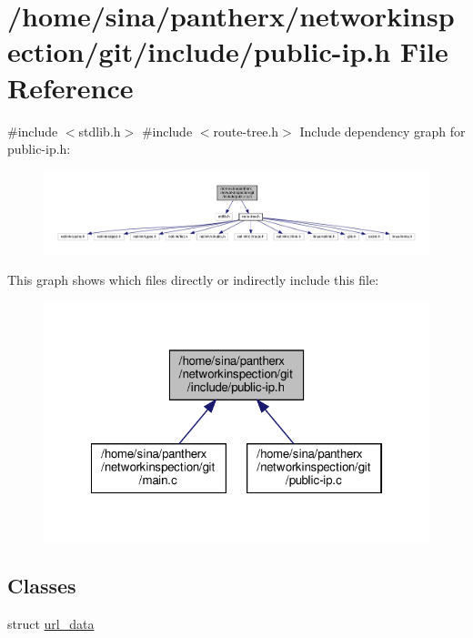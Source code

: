 \hypertarget{public-ip_8h}{}\section{/home/sina/pantherx/networkinspection/git/include/public-\/ip.h File Reference}
\label{public-ip_8h}
{\ttfamily \#include $<$stdlib.\+h$>$}\newline
{\ttfamily \#include $<$route-\/tree.\+h$>$}\newline
Include dependency graph for public-\/ip.h\+:\nopagebreak
\begin{figure}[H]
\begin{center}
\leavevmode
\includegraphics[width=350pt]{public-ip_8h__incl}
\end{center}
\end{figure}
This graph shows which files directly or indirectly include this file\+:\nopagebreak
\begin{figure}[H]
\begin{center}
\leavevmode
\includegraphics[width=322pt]{public-ip_8h__dep__incl}
\end{center}
\end{figure}
\subsection*{Classes}
\begin{DoxyCompactItemize}
\item 
struct \hyperlink{structurl__data}{url\+\_\+data}
\end{DoxyCompactItemize}
